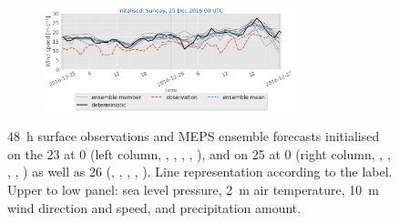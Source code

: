 \begin{figure}[H]
	\begin{subfigure}[b]{\textwidth}
		\centering
		\includegraphics[trim={5.5cm 0cm 5.cm 17.2cm},clip,
		width=0.8\textwidth]{./fig_sfc_ws/20161225_00}
	\end{subfigure}
	\caption{\SI{48}{\hour} surface observations and MEPS ensemble forecasts initialised on the \SI{23}{\dec} at \SI{0}{\UTC} (left column, \protect{}, \protect{}, \protect{}, \protect{}, \protect{}), and on \SI{25}{\dec} at \SI{0}{\UTC} (right column, \protect{}, \protect{}, \protect{}, \protect{}, \protect{}) as well as \SI{26}{\dec} (\protect{}, \protect{}, \protect{}, \protect{}, \protect{}). Line representation according to the label. Upper to low panel: sea level pressure, \SI{2}{\metre} air temperature, \SI{10}{\metre} wind direction and speed, and precipitation amount. }\label{fig:res:sfc_obs_meps}
\end{figure}
